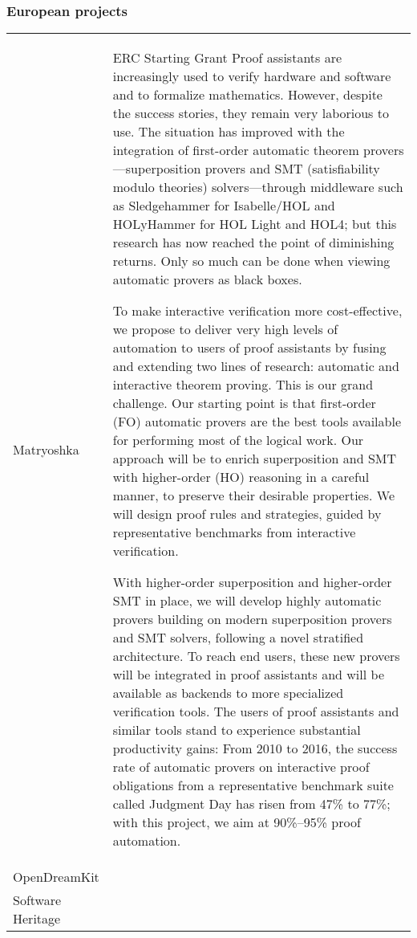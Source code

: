 
\subsubsection*{European projects}

\begin{longtable}{|p{}|p{}|}
\hline
Matryoshka & 
ERC Starting Grant
 Proof assistants are increasingly used to verify hardware and software and to formalize mathematics. However, despite the success stories, they remain very laborious to use. The situation has improved with the integration of first-order automatic theorem provers—superposition provers and SMT (satisfiability modulo theories) solvers—through middleware such as Sledgehammer for Isabelle/HOL and HOLyHammer for HOL Light and HOL4; but this research has now reached the point of diminishing returns. Only so much can be done when viewing automatic provers as black boxes.

To make interactive verification more cost-effective, we propose to deliver very high levels of automation to users of proof assistants by fusing and extending two lines of research: automatic and interactive theorem proving. This is our grand challenge. Our starting point is that first-order (FO) automatic provers are the best tools available for performing most of the logical work. Our approach will be to enrich superposition and SMT with higher-order (HO) reasoning in a careful manner, to preserve their desirable properties. We will design proof rules and strategies, guided by representative benchmarks from interactive verification.

With higher-order superposition and higher-order SMT in place, we will develop highly automatic provers building on modern superposition provers and SMT solvers, following a novel stratified architecture. To reach end users, these new provers will be integrated in proof assistants and will be available as backends to more specialized verification tools. The users of proof assistants and similar tools stand to experience substantial productivity gains: From 2010 to 2016, the success rate of automatic provers on interactive proof obligations from a representative benchmark suite called Judgment Day has risen from 
47\% to 77\%; with this project, we aim at 90\%–95\% proof automation. 
\\

OpenDreamKit & \\

Software Heritage & \\


\end{longtable}

